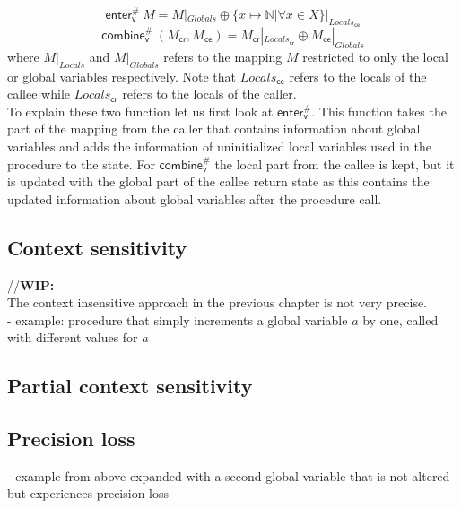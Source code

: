     \[\textsf{enter}^{\#}_\textsf{v}\ M = M|_{Globals} \oplus \{x \mapsto \mathbb{N} | \forall x \in X\}|_{Locals_\textsf{ce}} \]
    \[\textsf{combine}^{\#}_\textsf{v}\ (M_\textsf{cr}, M_\textsf{ce}) = M_\textsf{cr}|_{Locals_\textsf{cr}} \oplus M_\textsf{ce}|_{Globals} \]
    where $M|_{Locals}$ and $M|_{Globals}$ refers to the mapping $M$ restricted to only the local or global variables respectively. Note that $Locals_\textsf{ce}$ refers to the locals of the callee while $Locals_\textsf{cr}$ refers to the locals of the caller.\\
    To explain these two function let us first look at $\textsf{enter}^{\#}_\textsf{v}$. This function takes the part of the mapping from the caller that contains information about global variables and adds the information of uninitialized local variables used in the procedure to the state. For $\textsf{combine}^{\#}_\textsf{v}$ the local part from the callee is kept, but it is updated with the global part of the callee return state as this contains the updated information about global variables after the procedure call.\\

    \subsection{Context sensitivity}
    //\textbf{WIP:}\\
    The context insensitive approach in the previous chapter is not very precise.\\
    - example: procedure that simply increments a global variable $a$ by one, called with different values for $a$

    \subsection{Partial context sensitivity}

    \subsection{Precision loss}\label{section:precisionLoss}
    - example from above expanded with a second global variable that is not altered but experiences precision loss
    
  



